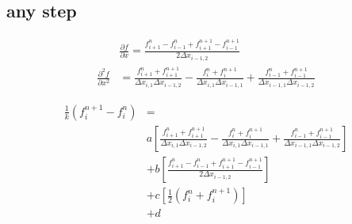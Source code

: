 \documentclass{article}
\begin{document}
\subsection{any step}

    \begin{equation}
        \begin{split}
            & \frac{\partial f}{\partial x} =
            \frac{f_{i+1}^n -f_{i-1}^n + f_{i+1}^{n+1} - f_{i-1}^{n+1}}
                {2 \Delta x_{i-1,2}} 
            \\
            \frac{\partial^2 f}{\partial x^2} &=
            \frac{f_{i+1}^n + f_{i+1}^{n+1}}
                {\Delta x_{i,1} \Delta x_{i-1,2}}
            - \frac{f_i^n + f_i^{n+1}}
                {\Delta x_{i,1} \Delta x_{i-1,1}}
            + \frac{f_{i-1}^n + f_{i-1}^{n+1}}
                {\Delta x_{i-1,1} \Delta x_{i-1,2}}
        \end{split}
    \end{equation}

    \begin{equation}
        \begin{split}
            \frac{1}{k}\left(f_i^{n+1} - f_i^n\right) &=
            \\
            & a \left[
                    \frac{f_{i+1}^n + f_{i+1}^{n+1}}
                        {\Delta x_{i,1} \Delta x_{i-1,2}}
                    - \frac{f_i^n + f_i^{n+1}}
                        {\Delta x_{i,1} \Delta x_{i-1,1}}
                    + \frac{f_{i-1}^n + f_{i-1}^{n+1}}
                        {\Delta x_{i-1,1} \Delta x_{i-1,2}}
                     \right]
            \\
            & + b \left[ 
                    \frac{f_{i+1}^n -f_{i-1}^n + f_{i+1}^{n+1} - f_{i-1}^{n+1}}
                        {2 \Delta x_{i-1,2}}
                     \right]
            \\
            & + c \left[ 
                \frac{1}{2} \left( f_i^n + f_i^{n+1} \right)
                     \right]
            \\
            & + d
        \end{split}
    \end{equation}
\end{document}
